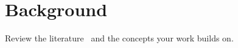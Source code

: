 \chapter{Background}
\label{ch:background}
Review the literature~\cite{example2024} and the concepts your work builds on.

